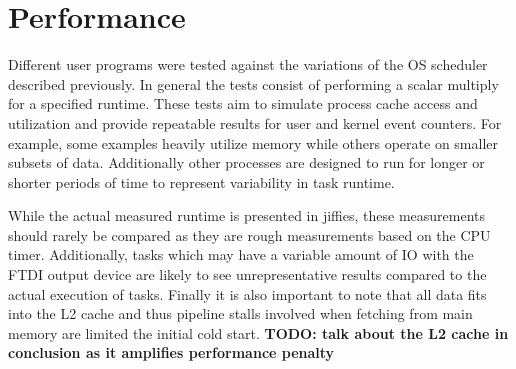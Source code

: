 \documentclass[11pt, twocolumn]{proc}
\begin{document}
\section{Performance}
\label{sec:performance}
Different user programs were tested against the variations of the OS scheduler described previously.  In general the tests consist of performing a scalar multiply for a specified runtime.  These tests aim to simulate process cache access and utilization and provide repeatable results for user and kernel event counters.  For example, some examples heavily utilize memory while others operate on smaller subsets of data.  Additionally other processes are designed to run for longer or shorter periods of time to represent variability in task runtime.

While the actual measured runtime is presented in jiffies, these measurements should rarely be compared as they are rough measurements based on the CPU timer.  Additionally, tasks which may have a variable amount of IO with the FTDI output device are likely to see unrepresentative results compared to the actual execution of tasks.  Finally it is also important to note that all data fits into the L2 cache and thus pipeline stalls involved when fetching from main memory are limited the initial cold start.  \textbf{TODO: talk about the L2 cache in conclusion as it amplifies performance penalty}

\begin{table}[h!]
    \centering
    \caption{single core - matrix 1x utilization}
\end{table}

\begin{table}[h!]
    \centering
    \caption{single core - matrix 4x utilization}
\end{table}
\end{document}
